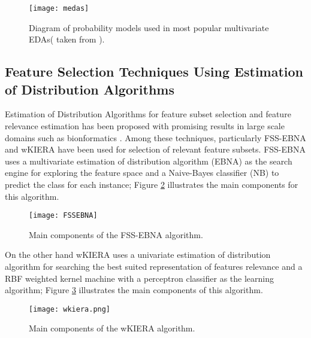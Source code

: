\begin{figure}[ht]
	\centering
		\texttt{[image: medas]}
	\caption[Diagram of probability models used in most popular multivariate EDAs.]%
	{Diagram of probability models used in most popular multivariate EDAs( taken from \cite{larranaga08}).}
	\label{fig:im05}
\end{figure}

 
\subsection{Feature Selection Techniques Using Estimation of Distribution Algorithms}
Estimation of Distribution Algorithms for feature subset selection and feature relevance estimation has been proposed with promising results in large scale domains such as bionformatics \cite{inza00,saeys03}. Among these techniques, particularly FSS-EBNA \cite{larranaga00FSS} and wKIERA\cite{rojas08} have been used for selection of relevant feature subsets.  
FSS-EBNA uses a multivariate estimation of distribution algorithm (EBNA) as the search engine for exploring the feature space and a Naive-Bayes classifier (NB) to predict the class for each instance; Figure \ref{fig:im06} illustrates the main components for this algorithm.

\begin{figure}[ht]
	\centering
		\texttt{[image: FSSEBNA]}
	\caption{Main components of the FSS-EBNA algorithm.}
	\label{fig:im06}
\end{figure}
 
On the other hand wKIERA uses a univariate estimation of distribution algorithm for searching the best suited representation of features relevance and a RBF weighted kernel machine with a perceptron classifier as the learning algorithm; Figure \ref{fig:im07} illustrates the main components of this algorithm.

\begin{figure}[ht]
	\centering
		\texttt{[image: wkiera.png]}
	\caption{Main components of the wKIERA algorithm.}
	\label{fig:im07}
\end{figure}
